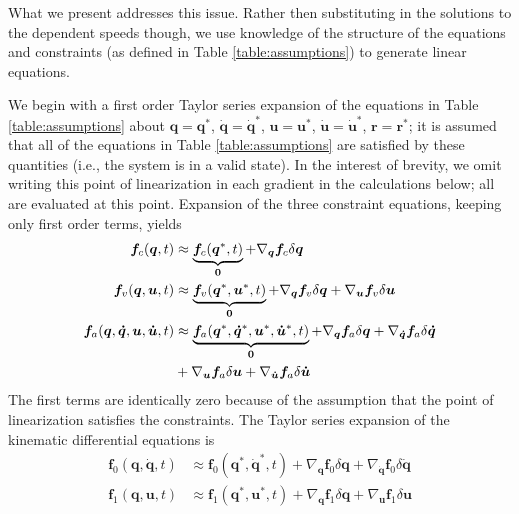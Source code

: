 \documentclass[smallcondensed,final]{svjour3}                     %
\begin{document}
What we present addresses this issue.
Rather then substituting in the solutions to the dependent speeds though, we
use knowledge of the structure of the equations and constraints (as defined in
Table \ref{table:assumptions}) to generate linear equations.


We begin with a first order Taylor series expansion of the equations in Table
\ref{table:assumptions} about $\bm{q}=\bm{q}^*$, $\bm{\dot{q}}=\bm{\dot{q}}^*$,
$\bm{u}=\bm{u}^*$, $\bm{\dot{u}}=\bm{\dot{u}}^*$, $\bm{r}=\bm{r}^*$; it is
assumed that all of the equations in Table \ref{table:assumptions} are
satisfied by these quantities (i.e., the system is in a valid state).
In the interest of brevity, we omit writing this point of linearization in each
gradient in the calculations below; all are evaluated at this point.
Expansion of the three constraint equations, keeping only first order terms,
yields
\begin{align}
  \label{eq:configuration_expansion}
  \bm{f}_{c}(\bm{q}, t) &\approx \underbrace{\bm{f}_{c}(\bm{q}^*, t)}_{\bm{0}} +
  \nabla_{\bm{q}}\bm{f}_{c} \delta \bm{q}\\
  \label{eq:velocity_expansion}
  \bm{f}_{v}(\bm{q}, \bm{u}, t) &\approx \underbrace{\bm{f}_{v}(\bm{q}^*,
  \bm{u}^*, t)}_{\bm{0}} +  \nabla_{\bm{q}}\bm{f}_{v} \delta \bm{q} +
  \nabla_{\bm{u}}\bm{f}_{v} \delta \bm{u} \\
  \label{eq:acceleration_expansion}
  \bm{f}_{a}(\bm{q}, \bm{\dot{q}}, \bm{u}, \bm{\dot{u}}, t) &\approx
  \underbrace{\bm{f}_{a}(\bm{q}^*, \bm{\dot{q}}^*, \bm{u}^*, \bm{\dot{u}}^*,
t)}_{\bm{0}} +  \nabla_{\bm{q}}\bm{f}_{a} \delta \bm{q} +
\nabla_{\bm{\dot{q}}}\bm{f}_{a}
 \delta \bm{\dot{q}} \notag\\
&+ \nabla_{\bm{u}}\bm{f}_{a} \delta \bm{u} + \nabla_{\bm{\dot{u}}}\bm{f}_{a}
\delta \bm{\dot{u}}
\end{align}
The first terms are identically zero because of the assumption that the
point of linearization satisfies the constraints.  The Taylor series expansion
of the kinematic differential equations is
\begin{align}
  \label{eq:f0_expansion}
  \bm{f}_{0}(\bm{q}, \bm{\dot{q}}, t) &\approx \bm{f}_{0}(\bm{q}^*,
  \bm{\dot{q}}^*, t) + \nabla_{\bm{q}}\bm{f}_{0} \delta\bm{q} +
  \nabla_{\bm{\dot{q}}}\bm{f}_{0} \delta\bm{\dot{q}}\\
  \label{eq:f1_expansion}
  \bm{f}_{1}(\bm{q}, \bm{u}, t) &\approx \bm{f}_{1}(\bm{q}^*,
  \bm{u}^*, t) + \nabla_{\bm{q}}\bm{f}_{1} \delta\bm{q} +
  \nabla_{\bm{u}}\bm{f}_{1} \delta\bm{u}
\end{align}
\end{document}
